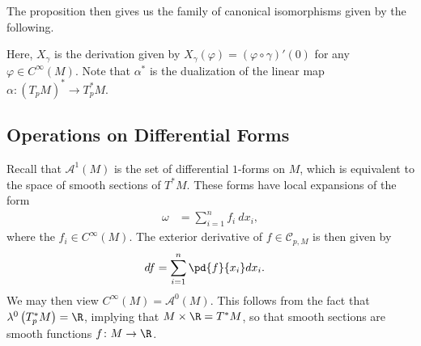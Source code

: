 \documentclass[10pt]{mypackage}
\begin{document}
The proposition then gives us the family of canonical isomorphisms given by the following.
\begin{center}
\end{center}
Here, $X_{\gamma}$ is the derivation given by $ X_{\gamma}\left( \varphi \right) = \left( \varphi\circ\gamma \right)'(0) $ for any $\varphi\in C^{\infty}\left( M \right)$. Note that $\alpha^{\ast}$ is the dualization of the linear map $\alpha\colon \left( T_pM \right)^{\ast}\rightarrow T_p^{\ast}M$.
\subsection{Operations on Differential Forms}%
Recall that $\mathcal{A}^1\left( M \right)$ is the set of differential $1$-forms on $M$, which is equivalent to the space of smooth sections of $T^{\ast}M$. These forms have local expansions of the form
\begin{align*}
  \omega &= \sum_{i=1}^{n} f_i\:dx_i,
\end{align*}
where the $f_i\in C^{\infty}\left( M \right)$. The exterior derivative of $f\in \mathcal{C}_{p,M}$ is then given by
\begin{align*}
  df &= \sum_{i=1}^{n} \pd{f}{x_i}dx_i.
\end{align*}
We may then view $C^{\infty}\left( M \right) = \mathcal{A}^{0}\left( M \right)$. This follows from the fact that $ \lambda^{0}\left( T_p^{\ast}M \right) = \R $, implying that $M\times \R = T^{\ast}M$, so that smooth sections are smooth functions $f\colon M\rightarrow \R$.\newline
\end{document}
